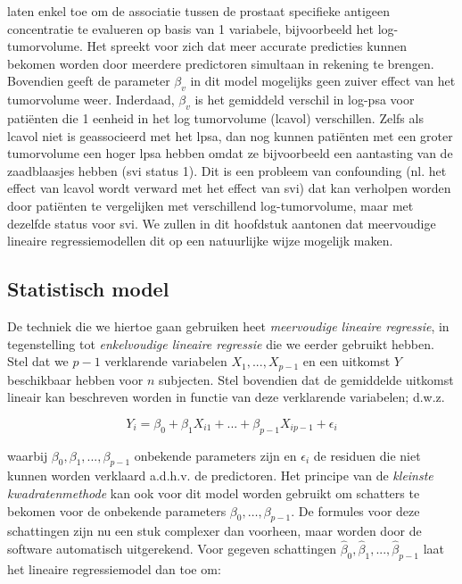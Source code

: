 \documentclass[
  dutch,
  letterpaper,
  12pt]{book}
\theoremstyle{definition}
\theoremstyle{definition}
\theoremstyle{definition}
\theoremstyle{remark}
\begin{document}
laten enkel toe om de associatie tussen de prostaat specifieke antigeen
concentratie te evalueren op basis van 1 variabele, bijvoorbeeld het
log-tumorvolume. Het spreekt voor zich dat meer accurate predicties
kunnen bekomen worden door meerdere predictoren simultaan in rekening te
brengen. Bovendien geeft de parameter \(\beta_v\) in dit model mogelijks
geen zuiver effect van het tumorvolume weer. Inderdaad, \(\beta_v\) is
het gemiddeld verschil in log-psa voor patiënten die 1 eenheid in het
log tumorvolume (lcavol) verschillen. Zelfs als lcavol niet is
geassocieerd met het lpsa, dan nog kunnen patiënten met een groter
tumorvolume een hoger lpsa hebben omdat ze bijvoorbeeld een aantasting
van de zaadblaasjes hebben (svi status 1). Dit is een probleem van
confounding (nl. het effect van lcavol wordt verward met het effect van
svi) dat kan verholpen worden door patiënten te vergelijken met
verschillend log-tumorvolume, maar met dezelfde status voor svi. We
zullen in dit hoofdstuk aantonen dat meervoudige lineaire
regressiemodellen dit op een natuurlijke wijze mogelijk maken.

\subsection{Statistisch model}\label{statistisch-model}

De techniek die we hiertoe gaan gebruiken heet \emph{meervoudige
lineaire regressie}, in tegenstelling tot \emph{enkelvoudige lineaire
regressie} die we eerder gebruikt hebben. Stel dat we \(p-1\)
verklarende variabelen \(X_1,...,X_{p-1}\) en een uitkomst \(Y\)
beschikbaar hebben voor \(n\) subjecten. Stel bovendien dat de
gemiddelde uitkomst lineair kan beschreven worden in functie van deze
verklarende variabelen; d.w.z.

\[
Y_i =\beta_0 + \beta_1 X_{i1} + ... +\beta_{p-1} X_{ip-1} + \epsilon_i
\]

waarbij \(\beta_0,\beta_1,...,\beta_{p-1}\) onbekende parameters zijn en
\(\epsilon_i\) de residuen die niet kunnen worden verklaard a.d.h.v. de
predictoren. Het principe van de \emph{kleinste kwadratenmethode} kan
ook voor dit model worden gebruikt om schatters te bekomen voor de
onbekende parameters \(\beta_0, \ldots, \beta_{p-1}\). De formules voor
deze schattingen zijn nu een stuk complexer dan voorheen, maar worden
door de software automatisch uitgerekend. Voor gegeven schattingen
\(\hat{\beta}_0,\hat{\beta}_1,...,\hat{\beta}_{p-1}\) laat het lineaire
regressiemodel dan toe om:
\end{document}
